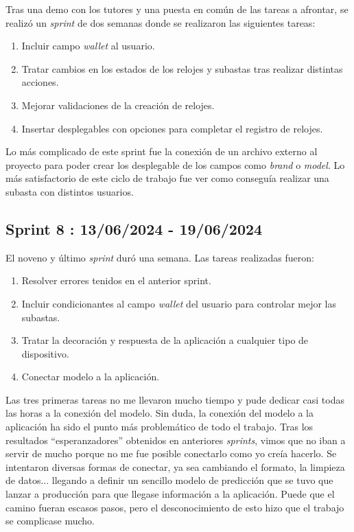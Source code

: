 	Tras una demo con los tutores y una puesta en común de las tareas a afrontar, se realizó un \emph{sprint} de dos semanas donde se realizaron las siguientes tareas:
	\begin{enumerate}
		\item Incluir campo \emph{wallet} al usuario.
		\item Tratar cambios en los estados de los relojes y subastas tras realizar distintas acciones.
		\item Mejorar validaciones de la creación de relojes.
		\item Insertar desplegables con opciones para completar el registro de relojes.
	\end{enumerate}
	Lo más complicado de este sprint fue la conexión de un archivo externo al proyecto para poder crear los desplegable de los campos como \emph{brand} o \emph{model}. Lo más satisfactorio de este ciclo de trabajo fue ver como conseguía realizar una subasta con distintos usuarios.
	
\subsection{Sprint 8 : 13/06/2024 - 19/06/2024}

	El noveno y último \emph{sprint} duró una semana. Las tareas realizadas fueron:
	\begin{enumerate}
		\item Resolver errores tenidos en el anterior sprint.
		\item Incluir condicionantes al campo \emph{wallet} del usuario para controlar mejor las subastas.
		\item Tratar la decoración y respuesta de la aplicación a cualquier tipo de dispositivo.
		\item Conectar modelo a la aplicación.
	\end{enumerate}
	Las tres primeras tareas no me llevaron mucho tiempo y pude dedicar casi todas las horas a la conexión del modelo. Sin duda, la conexión del modelo a la aplicación ha sido el punto más problemático de todo el trabajo. Tras los resultados ``esperanzadores'' obtenidos en anteriores \emph{sprints}, vimos que no iban a servir de mucho porque no me fue posible conectarlo como yo creía hacerlo. Se intentaron diversas formas de conectar, ya sea cambiando el formato, la limpieza de datos... llegando a definir un sencillo modelo de predicción que se tuvo que lanzar a producción para que llegase información a la aplicación. Puede que el camino fueran escasos pasos, pero el desconocimiento de esto hizo que el trabajo se complicase mucho.
	

